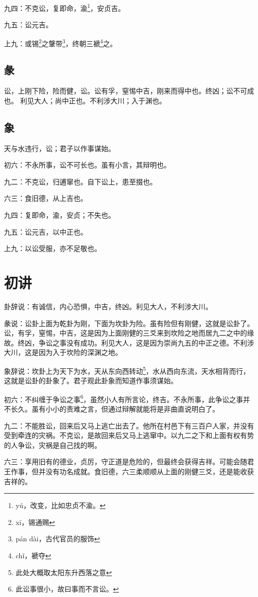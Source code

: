 \documentclass[12pt,oneside]{book}
\begin{document}
九四：不克讼，复即命，渝\footnote{yú，改变，比如忠贞不渝。}，安贞吉。

九五：讼元吉。

上九：或锡\footnote{xī，锡通赐}之鞶带\footnote{pán dài，古代官员的服饰}，终朝三褫\footnote{chǐ，褫夺}之。

\subsection{彖}
讼，上刚下险，险而健，讼。讼有孚，窒惕中吉，刚来而得中也。终凶；讼不可成也。 利见大人；尚中正也。不利涉大川；入于渊也。

\subsection{象}
天与水违行，讼；君子以作事谋始。

初六：不永所事，讼不可长也。虽有小言，其辩明也。

九二：不克讼，归逋窜也。自下讼上，患至掇也。

六三：食旧德，从上吉也。

九四：复即命，渝，安贞；不失也。

九五：讼元吉，以中正也。

上九：以讼受服，亦不足敬也。


\section{初讲}
卦辞说：有诚信，内心恐惧，中吉，终凶。利见大人，不利涉大川。

彖说：讼卦上面为乾卦为刚，下面为坎卦为险。虽有险但有刚健，这就是讼卦了。讼，有孚，窒惕，中吉，这是因为上面刚健的三爻来到坎险之地而居九二之中的缘故。终凶，争讼之事没有成功。利见大人，这是因为崇尚九五的中正之德。不利涉大川，这是因为入于坎险的深渊之地。

象辞说：坎卦上为天下为水，天从东向西转动\footnote{此处大概取太阳东升西落之意}，水从西向东流，天水相背而行，这就是讼卦的卦象了。君子观此卦象而知道作事须谋始。

初六：不纠缠于争讼之事\footnote{此讼事很小，故曰事而不言讼。}，虽然小人有所言论，终吉。不永所事，此争讼之事并不长久。虽有小小的责难之言，但通过辩解就能将是非曲直说明白了。

九二：不能胜讼，回来后又马上逃亡出去了。他所在村邑下有三百户人家，并没有受到牵连的灾祸。不克讼，是故回来后又马上逃窜中。以九二之下和上面有权有势的人争讼，灾祸是自己找的啊。

六三：享用旧有的德业，贞厉，守正道是危险的，但最终会获得吉祥。可能会随君王作事，但并没有功名成就。食旧德，六三柔顺顺从上面的刚健三爻，还是能收获吉祥的。
\end{document}
